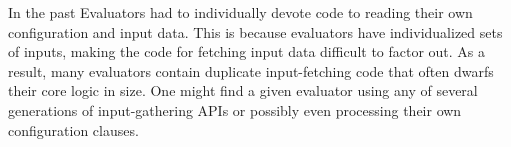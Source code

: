 \documentclass{elsart}
\begin{document}
In the past Evaluators had to individually devote code to reading their own configuration and input data.  This is because evaluators have individualized sets of inputs, making the code for fetching input data difficult to factor out.  As a result, many evaluators contain duplicate input-fetching code that often dwarfs their core logic in size.  One might find a given evaluator using any of several generations of input-gathering APIs or possibly even processing their own configuration clauses.
\end{document}
